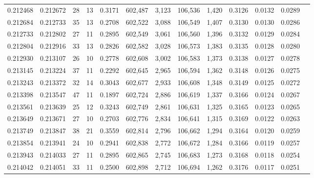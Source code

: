 \begin{tabular}{rrrrrrrrrrrrr}
0.212468 & 0.212672 &    28 &  13 &                                     0.3171 & 602,487 &   3,123 & 106,536 &   1,420 & 0.3126 & 0.0132 & 0.0289 \\
0.212684 & 0.212733 &    35 &  13 &                                     0.2708 & 602,522 &   3,088 & 106,549 &   1,407 & 0.3130 & 0.0130 & 0.0286 \\
0.212733 & 0.212802 &    27 &  11 &                                     0.2895 & 602,549 &   3,061 & 106,560 &   1,396 & 0.3132 & 0.0129 & 0.0284 \\
0.212804 & 0.212916 &    33 &  13 &                                     0.2826 & 602,582 &   3,028 & 106,573 &   1,383 & 0.3135 & 0.0128 & 0.0280 \\
0.212930 & 0.213107 &    26 &  10 &                                     0.2778 & 602,608 &   3,002 & 106,583 &   1,373 & 0.3138 & 0.0127 & 0.0278 \\
0.213145 & 0.213224 &    37 &  11 &                                     0.2292 & 602,645 &   2,965 & 106,594 &   1,362 & 0.3148 & 0.0126 & 0.0275 \\
0.213243 & 0.213372 &    32 &  14 &                                     0.3043 & 602,677 &   2,933 & 106,608 &   1,348 & 0.3149 & 0.0125 & 0.0272 \\
0.213398 & 0.213547 &    47 &  11 &                                     0.1897 & 602,724 &   2,886 & 106,619 &   1,337 & 0.3166 & 0.0124 & 0.0267 \\
0.213561 & 0.213639 &    25 &  12 &                                     0.3243 & 602,749 &   2,861 & 106,631 &   1,325 & 0.3165 & 0.0123 & 0.0265 \\
0.213649 & 0.213671 &    27 &  10 &                                     0.2703 & 602,776 &   2,834 & 106,641 &   1,315 & 0.3169 & 0.0122 & 0.0263 \\
0.213749 & 0.213847 &    38 &  21 &                                     0.3559 & 602,814 &   2,796 & 106,662 &   1,294 & 0.3164 & 0.0120 & 0.0259 \\
0.213854 & 0.213941 &    24 &  10 &                                     0.2941 & 602,838 &   2,772 & 106,672 &   1,284 & 0.3166 & 0.0119 & 0.0257 \\
0.213943 & 0.214033 &    27 &  11 &                                     0.2895 & 602,865 &   2,745 & 106,683 &   1,273 & 0.3168 & 0.0118 & 0.0254 \\
0.214042 & 0.214051 &    33 &  11 &                                     0.2500 & 602,898 &   2,712 & 106,694 &   1,262 & 0.3176 & 0.0117 & 0.0251 \\

\end{tabular}

